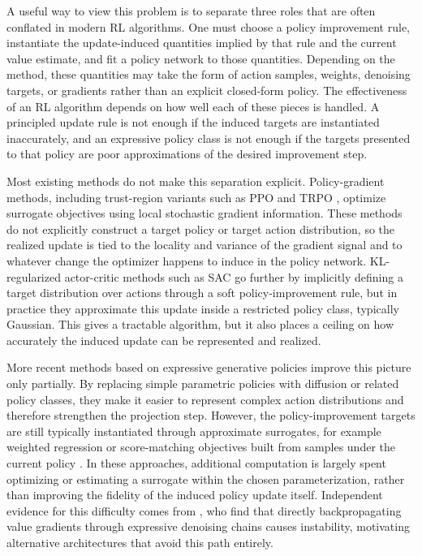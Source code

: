 \documentclass{article}
\theoremstyle{plain}
\theoremstyle{definition}
\theoremstyle{remark}
\begin{document}
A useful way to view this problem is to separate three roles that are often conflated in modern RL algorithms. One must choose a policy improvement rule, instantiate the update-induced quantities implied by that rule and the current value estimate, and fit a policy network to those quantities. Depending on the method, these quantities may take the form of action samples, weights, denoising targets, or gradients rather than an explicit closed-form policy. The effectiveness of an RL algorithm depends on how well each of these pieces is handled. A principled update rule is not enough if the induced targets are instantiated inaccurately, and an expressive policy class is not enough if the targets presented to that policy are poor approximations of the desired improvement step.

Most existing methods do not make this separation explicit. Policy-gradient methods, including trust-region variants such as PPO \citep{schulman2017ppo} and TRPO \citep{schulman2015trust}, optimize surrogate objectives using local stochastic gradient information. These methods do not explicitly construct a target policy or target action distribution, so the realized update is tied to the locality and variance of the gradient signal and to whatever change the optimizer happens to induce in the policy network. KL-regularized actor-critic methods such as SAC \citep{haarnoja2018sac} go further by implicitly defining a target distribution over actions through a soft policy-improvement rule, but in practice they approximate this update inside a restricted policy class, typically Gaussian. This gives a tractable algorithm, but it also places a ceiling on how accurately the induced update can be represented and realized.

More recent methods based on expressive generative policies improve this picture only partially. By replacing simple parametric policies with diffusion \citep{ho2020denoising,song2021sde} or related policy classes, they make it easier to represent complex action distributions and therefore strengthen the projection step. However, the policy-improvement targets are still typically instantiated through approximate surrogates, for example weighted regression or score-matching objectives built from samples under the current policy \citep{ma2025soft}. In these approaches, additional computation is largely spent optimizing or estimating a surrogate within the chosen parameterization, rather than improving the fidelity of the induced policy update itself. Independent evidence for this difficulty comes from \citet{dong2025expo}, who find that directly backpropagating value gradients through expressive denoising chains causes instability, motivating alternative architectures that avoid this path entirely.
\end{document}
